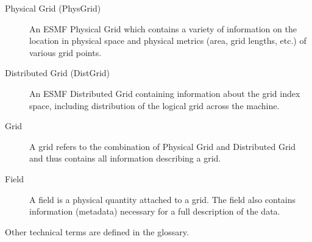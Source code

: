 
\begin{description}

\item [Physical Grid (PhysGrid)] \label{term:physgrid} 
      An ESMF Physical Grid which contains a variety of information
      on the location in physical space and physical metrics (area,
      grid lengths, etc.) of various grid points.

\item [Distributed Grid (DistGrid)] \label{term:distgrid}
      An ESMF Distributed Grid containing information about the
      grid index space, including distribution of the logical
      grid across the machine.

\item [Grid] \label{term:grid}
      A grid refers to the combination of Physical Grid and
      Distributed Grid and thus contains all information
      describing a grid.

\item [Field] \label{term:field}
      A field is a physical quantity attached to
      a grid.  The field also contains information (metadata)
      necessary for a full description of the data. 

\end{description}

\noindent Other technical terms are defined in the glossary.

